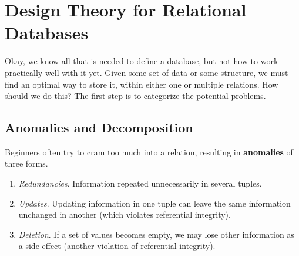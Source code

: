 \section{Design Theory for Relational Databases}
    
  Okay, we know all that is needed to define a database, but not how to work practically well with it yet. Given some set of data or some structure, we must find an optimal way to store it, within either one or multiple relations. How should we do this? The first step is to categorize the potential problems. 

\subsection{Anomalies and Decomposition}
  
  \begin{definition}[Anomaly]
    \label{def:anomaly}
    Beginners often try to cram too much into a relation, resulting in \textbf{anomalies} of three forms. 
    \begin{enumerate}
      \item \textit{Redundancies}. Information repeated unnecessarily in several tuples. 
      \item \textit{Updates}. Updating information in one tuple can leave the same information unchanged in another (which violates referential integrity). 
      \item \textit{Deletion}. If a set of values becomes empty, we may lose other information as a side effect (another violation of referential integrity). 
    \end{enumerate}
  \end{definition}


